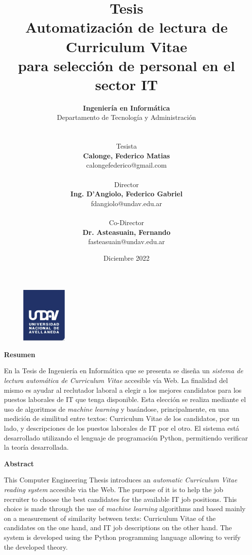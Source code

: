 \documentclass[12pt,a4paper]{article}
\author{
	\textbf{Ingeniería en Informática}\\
	Departamento de Tecnología y Administración\\
	\\~\\
	Tesista\\
	\textbf{Calonge, Federico Matias}\\
	calongefederico@gmail.com
 	\\~\\
 	Director\\ 
 	\textbf{Ing. D'Angiolo, Federico Gabriel}\\
 	fdangiolo@undav.edu.ar
 	\\~\\
 	Co-Director\\ 
 	\textbf{Dr. Asteasuain, Fernando}\\
 	fasteasuain@undav.edu.ar
}
\title{
  Tesis \\
  \large Automatización de lectura de Curriculum Vitae  \\
    para selección de personal en el sector IT}
\date{Diciembre 2022}
\begin{document}
\begin{sloppypar}
\begin{figure}
  \centering
  \includegraphics[width=0.2\textwidth]{images/undav-logo.png} 	%
  \label{fig:undav-logo}
\end{figure}
\maketitle       		%

\cleardoublepage    %

\begin{center}
    \Large
    \vspace{0.9cm}
    \textbf{Resumen}
    
\end{center}

En la Tesis de Ingeniería en Informática que se presenta se diseña un \textit{sistema de lectura automática de Curriculum Vitae} accesible vía Web. La finalidad del mismo es ayudar al reclutador laboral a elegir a los mejores candidatos para los puestos laborales de IT que tenga disponible. Esta elección se realiza mediante el uso de algoritmos de \textit{machine learning} y basándose, principalmente, en una medición de similitud entre textos: Curriculum Vitae de los candidatos, por un lado, y descripciones de los puestos laborales de IT por el otro.
El sistema está desarrollado utilizando el lenguaje de programación Python, permitiendo verificar la teoría desarrollada.

\begin{center}
    \Large
    \vspace{0.9cm}
    \textbf{Abstract}
\end{center}

This Computer Engineering Thesis introduces an \textit{automatic Curriculum Vitae reading system} accesible via the Web. The purpose of it is to help the job recruiter to choose the best candidates for the available IT job positions. This choice is made through the use of \textit{machine learning} algorithms and based mainly on a measurement of similarity between texts: Curriculum Vitae of the candidates on the one hand, and IT job descriptions on the other hand.
The system is developed using the Python programming language allowing to verify the developed theory.


\end{sloppypar}
\end{document}
